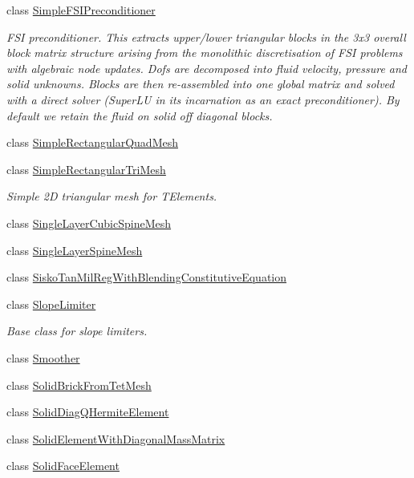 \begin{DoxyCompactItemize}
class \hyperlink{classoomph_1_1SimpleFSIPreconditioner}{Simple\+F\+S\+I\+Preconditioner}
\begin{DoxyCompactList}\small\item\em F\+SI preconditioner. This extracts upper/lower triangular blocks in the 3x3 overall block matrix structure arising from the monolithic discretisation of F\+SI problems with algebraic node updates. Dofs are decomposed into fluid velocity, pressure and solid unknowns. Blocks are then re-\/assembled into one global matrix and solved with a direct solver (Super\+LU in its incarnation as an exact preconditioner). By default we retain the fluid on solid off diagonal blocks. \end{DoxyCompactList}\item 
class \hyperlink{classoomph_1_1SimpleRectangularQuadMesh}{Simple\+Rectangular\+Quad\+Mesh}
\item 
class \hyperlink{classoomph_1_1SimpleRectangularTriMesh}{Simple\+Rectangular\+Tri\+Mesh}
\begin{DoxyCompactList}\small\item\em Simple 2D triangular mesh for T\+Elements. \end{DoxyCompactList}\item 
class \hyperlink{classoomph_1_1SingleLayerCubicSpineMesh}{Single\+Layer\+Cubic\+Spine\+Mesh}
\item 
class \hyperlink{classoomph_1_1SingleLayerSpineMesh}{Single\+Layer\+Spine\+Mesh}
\item 
class \hyperlink{classoomph_1_1SiskoTanMilRegWithBlendingConstitutiveEquation}{Sisko\+Tan\+Mil\+Reg\+With\+Blending\+Constitutive\+Equation}
\item 
class \hyperlink{classoomph_1_1SlopeLimiter}{Slope\+Limiter}
\begin{DoxyCompactList}\small\item\em Base class for slope limiters. \end{DoxyCompactList}\item 
class \hyperlink{classoomph_1_1Smoother}{Smoother}
\item 
class \hyperlink{classoomph_1_1SolidBrickFromTetMesh}{Solid\+Brick\+From\+Tet\+Mesh}
\item 
class \hyperlink{classoomph_1_1SolidDiagQHermiteElement}{Solid\+Diag\+Q\+Hermite\+Element}
\item 
class \hyperlink{classoomph_1_1SolidElementWithDiagonalMassMatrix}{Solid\+Element\+With\+Diagonal\+Mass\+Matrix}
\item 
class \hyperlink{classoomph_1_1SolidFaceElement}{Solid\+Face\+Element}

\end{DoxyCompactItemize}

